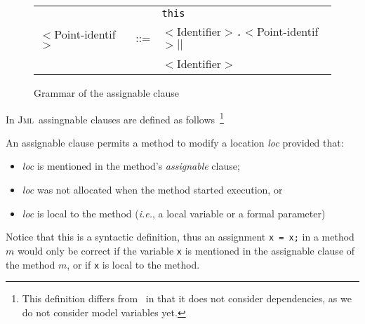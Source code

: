 \documentclass[a4paper]{llncs}
\newcommand{\jml}{\textsc{Jml}}
\newcommand{\java}{\textsc{Java}}
\begin{document}
\begin{figure}[hbt]
\begin{tabular}{lll}
                           &     &\texttt{this} \\
$<$\textsf{Point-identif}$>$   &::=  &$<$\textsf{Identifier}$>$\texttt{.}$<$\textsf{Point-identif}$> $$||$ \\
                           &     &$<$\textsf{Identifier}$>$ \\
\end{tabular}
\label{fig-syn-mod-spe}
\caption{Grammar of the assignable clause}
\end{figure}

In \jml\ assingnable clauses are defined as
follows~\cite{LeavensBR00}\footnote{This definition differs
from~\cite{LeavensBR00} in that it does not consider dependencies, 
as we do not consider model variables yet.}
\begin{definition}
\label{def-mod}
An assignable clause permits a method to modify a location \emph{loc}
provided that:
\begin{itemize}
\item \emph{loc} is mentioned in the method's \emph{assignable}
clause;
\item \emph{loc} was not allocated when the method started execution, or
\item \emph{loc} is local to the method (\emph{i.e.}, a local
variable or a formal parameter)
\end{itemize}
\end{definition}

Notice that this is a syntactic definition, thus an assignment
\texttt{x = x;} in a method \(m\) would only be correct if the 
variable \texttt{x} is mentioned in the assignable clause of the
method \(m\), or if \texttt{x} is local to the method.

\end{document}

